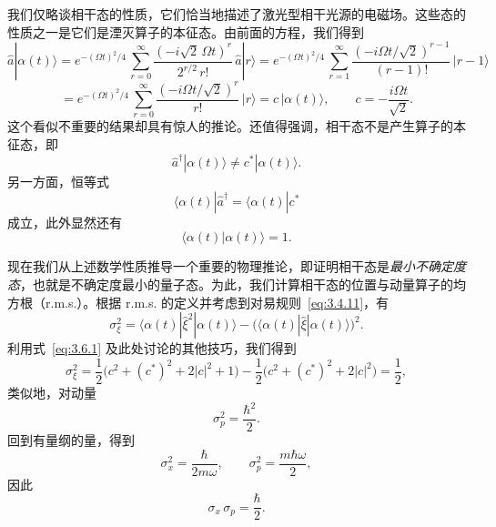 我们仅略谈相干态的性质，它们恰当地描述了激光型相干光源的电磁场。这些态的性质之一是它们是湮灭算子的本征态。由前面的方程，我们得到
\[
\hat a|\alpha(t)\rangle=
e^{-(\Omega t)^2/4}\,
\sum_{r=0}^{\infty}\frac{(-i\sqrt{2}\,\Omega t)^r}{2^{r/2}\,r!}\,
\hat a|r\rangle
=e^{-(\Omega t)^2/4}\,
\sum_{r=1}^{\infty}\frac{(-i\Omega t/\sqrt{2})^{r-1}}{(r-1)!}\,
|r-1\rangle
\]
\begin{equation}
=e^{-(\Omega t)^2/4}\,
\sum_{r=0}^{\infty}\frac{(-i\Omega t/\sqrt{2})^r}{r!}\,
|r\rangle
=c\,|\alpha(t)\rangle,\qquad
c=-\frac{i\Omega t}{\sqrt{2}}.
\label{eq:3.6.10}
\end{equation}
这个看似不重要的结果却具有惊人的推论。还值得强调，相干态不是产生算子的本征态，即
\begin{equation}
\hat a^\dagger|\alpha(t)\rangle\neq c^*|\alpha(t)\rangle.
\label{eq:3.6.11}
\end{equation}
另一方面，恒等式
\begin{equation}
\langle\alpha(t)|\hat a^\dagger=\langle\alpha(t)|c^*
\label{eq:3.6.12}
\end{equation}
成立，此外显然还有
\begin{equation}
\langle\alpha(t)|\alpha(t)\rangle=1.
\label{eq:3.6.13}
\end{equation}

现在我们从上述数学性质推导一个重要的物理推论，即证明相干态是\emph{最小不确定度态}，也就是不确定度最小的量子态。为此，我们计算相干态的位置与动量算子的均方根（r.m.s.）。根据 r.m.s. 的定义并考虑到对易规则~\eqref{eq:3.4.11}，有
\begin{equation}
\sigma_\xi^2=
\langle\alpha(t)|\hat\xi^2|\alpha(t)\rangle-
\bigl(\langle\alpha(t)|\hat\xi|\alpha(t)\rangle\bigr)^2.
\label{eq:3.6.14}
\end{equation}
利用式~\eqref{eq:3.6.1} 及此处讨论的其他技巧，我们得到
\begin{equation}
\sigma_\xi^2=\frac{1}{2}\bigl(c^2+(c^*)^2+2|c|^2+1\bigr)
-\frac{1}{2}\bigl(c^2+(c^*)^2+2|c|^2\bigr)=\frac{1}{2},
\label{eq:3.6.15}
\end{equation}
类似地，对动量
\begin{equation}
\sigma_p^2=\frac{\hbar^2}{2}.
\label{eq:3.6.16}
\end{equation}
回到有量纲的量，得到
\begin{equation}
\sigma_x^2=\frac{\hbar}{2m\omega},\qquad
\sigma_p^2=\frac{m\hbar\omega}{2},
\label{eq:3.6.17}
\end{equation}
因此
\begin{equation}
\sigma_x\,\sigma_p=\frac{\hbar}{2}.
\label{eq:3.6.18}
\end{equation}

